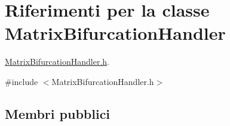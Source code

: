 \hypertarget{classMatrixBifurcationHandler}{\section{Riferimenti per la classe Matrix\-Bifurcation\-Handler}
\label{classMatrixBifurcationHandler}
}


\hyperlink{MatrixBifurcationHandler_8h}{Matrix\-Bifurcation\-Handler.\-h}.  




{\ttfamily \#include $<$Matrix\-Bifurcation\-Handler.\-h$>$}

\subsection*{Membri pubblici}
